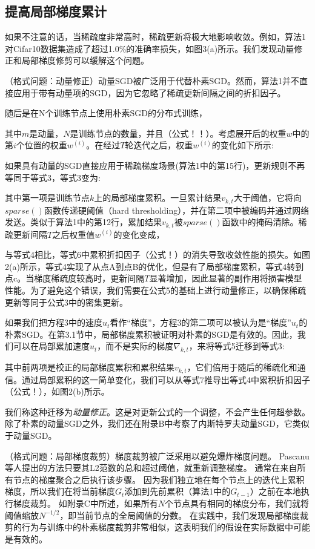 \subsection{提高局部梯度累计}
如果不注意的话，当稀疏度非常高时，稀疏更新将极大地影响收敛。例如，算法1对Cifar10数据集造成了超过1.0\%的准确率损失，如图3(a)所示。我们发现动量修正和局部梯度修剪可以缓解这个问题。

（格式问题：动量修正）动量SGD被广泛用于代替朴素SGD。然而，算法1并不直接应用于带有动量项的SGD，因为它忽略了稀疏更新间隔之间的折扣因子。

随后是在N个训练节点上使用朴素SGD的分布式训练，

其中$m$是动量，$N$是训练节点的数量，并且（公式！！）。考虑展开后的权重$w$中的第$i$个位置的权重$w^{(i)}$。在经过$T$轮迭代之后，权重$w^{(i)}$的变化如下所示:

如果具有动量的SGD直接应用于稀疏梯度场景(算法1中的第15行)，更新规则不再等同于等式3，等式3变为:

其中第一项是训练节点$k$上的局部梯度累积。一旦累计结果$v_{k,t}$大于阈值，它将向$sparse()$函数传递硬阈值（hard thresholding），并在第二项中被编码并通过网络发送。类似于算法1中的第12行，累加结果$v_{k,t}$被$sparse()$函数中的掩码清除。稀疏更新间隔$T$之后权重值$w^{(i)}$的变化变成，

与等式4相比，等式6中累积折扣因子（公式！）的消失导致收敛性能的损失。如图2(a)所示，等式4实现了从点A到点B的优化，但是有了局部梯度累积，等式4转到点c。当梯度稀疏度较高时，更新间隔$T$显著增加，因此显著的副作用将损害模型性能。为了避免这个错误，我们需要在公式5的基础上进行动量修正，以确保稀疏更新等同于公式3中的密集更新。

如果我们把方程3中的速度$u_t$看作“梯度”，方程3的第二项可以被认为是“梯度”$u_t$的朴素SGD。在第3.1节中，局部梯度累积被证明对朴素的SGD是有效的。因此，我们可以在局部累加速度$u_t$，而不是实际的梯度$\nabla_{k,t}$，来将等式5迁移到等式3:

其中前两项是校正的局部梯度累积和累积结果$v_{k,t}$，它们倍用于随后的稀疏化和通信。通过局部累积的这一简单变化，我们可以从等式7推导出等式4中累积折扣因子（公式！），如图2(b)所示。

我们称这种迁移为\textit{动量修正}。这是对更新公式的一个调整，不会产生任何超参数。除了朴素的动量SGD之外，我们还在附录B中考察了内斯特罗夫动量SGD，它类似于动量SGD。

（格式问题：局部梯度裁剪）梯度裁剪被广泛采用以避免爆炸梯度问题。 Pascanu等人提出的方法只要其L2范数的总和超过阈值，就重新调整梯度。 通常在来自所有节点的梯度聚合之后执行该步骤。 因为我们独立地在每个节点上的迭代上累积梯度，所以我们在将当前梯度$G_t$添加到先前累积（算法1中的$G_{t-1}$）之前在本地执行梯度裁剪。 如附录C中所述，如果所有$N$个节点具有相同的梯度分布，我们就将阈值缩放$N^{-1/2}$，即当前节点的全局阈值的分数。 在实践中，我们发现局部梯度裁剪的行为与训练中的朴素梯度裁剪非常相似，这表明我们的假设在实际数据中可能是有效的。

